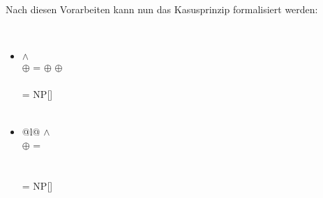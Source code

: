 {\noindent
Nach diesen Vorarbeiten kann nun das Kasusprinzip formalisiert werden:

\medskip
\noindent
\begin{minipage}{\linewidth}
\begin{prinzip-break}[Kasusprinzip]
~
\begin{itemize}
\item[\textrm{a.}]
 $\wedge$\\
 $\oplus$  =  $\oplus$  $\oplus$ \etag
\impl\\\\
\mbox{}\hspace{3cm}  = \textrm{NP[\snom]}\\\\
\end{itemize}
\end{prinzip-break}
\end{minipage}

%

\begin{itemize}
\item[\textrm{b.}]
\begin{tabular}[t]{@{}l@{}}
 $\wedge$\\
 $\oplus$  =\\
\\\\
\mbox{}\hspace{3cm}  = \textrm{NP[\sacc]}
\end{tabular}
\end{itemize}

}
